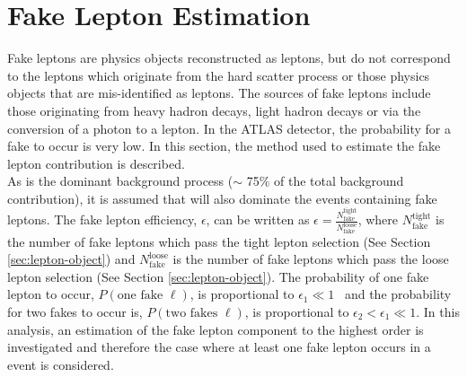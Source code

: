 \section{Fake Lepton Estimation}
\label{sec:fakelepest}
Fake leptons are physics objects reconstructed as leptons, but do not correspond to the leptons which originate from the hard scatter process or those physics objects that are mis-identified as leptons. The sources of fake leptons include those originating from heavy hadron decays, light hadron decays or via the conversion of a photon to a lepton. In the ATLAS detector, the probability for a fake to occur is very low. In this section, the method used to estimate the fake lepton contribution is described.\\

As \ttZ is the dominant background process ($\sim$ 75$\%$ of the total background contribution), it is assumed that \ttZ will also dominate the events containing fake leptons. The fake lepton efficiency, $\epsilon$, can be written as $\epsilon = \frac{N_{\text{fake}}^{\text{tight}}}{N_{\text{fake}}^{\text{loose}}}$, where $N_{\text{fake}}^{\text{tight}}$ is the number of fake leptons which pass the tight lepton selection (See Section \ref{sec:lepton-object}) and $N_{\text{fake}}^{\text{loose}}$ is the number of fake leptons which pass the loose lepton selection (See Section \ref{sec:lepton-object}). The probability of one fake lepton to occur, $P(\text{one fake }\ell)$, is proportional to $\epsilon_{1} \ll 1$~\cite{lesage2017lepton, ATLAS-CONF-2012-048} and the probability for two fakes to occur is, $P(\text{two fakes }\ell)$, is proportional to $\epsilon_{2} < \epsilon_{1} \ll 1$. In this analysis, an estimation of the fake lepton component to the highest order is investigated and therefore the case where at least one fake lepton occurs in a \ttZ event is considered.\\

